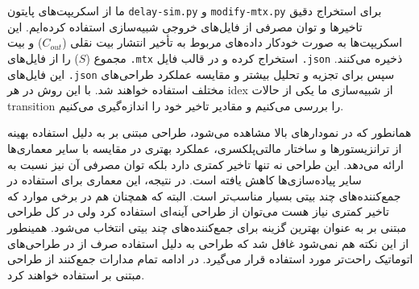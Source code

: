 ما از اسکریپت‌های پایتون \texttt{delay-sim.py} و \texttt{modify-mtx.py} برای استخراج دقیق تاخیرها و توان مصرفی از فایل‌های خروجی شبیه‌سازی استفاده کرده‌ایم. این اسکریپت‌ها به صورت خودکار داده‌های مربوط به تأخیر انتشار بیت نقلی ($C_{out}$) و بیت مجموع ($S$) را از فایل‌های \texttt{.mtx} استخراج کرده و در قالب فایل \texttt{.json} ذخیره می‌کنند. این فایل‌های \texttt{.json} سپس برای تجزیه و تحلیل بیشتر و مقایسه عملکرد طراحی‌های مختلف استفاده خواهند شد.
با این روش در هر idex از شبیه‌سازی ما یکی از حالات transition را بررسی می‌کنیم و مقادیر تاخیر خود را اندازه‌گیری می‌کنیم.



همانطور که در نمودارهای بالا مشاهده می‌شود، طراحی مبتنی بر  به دلیل استفاده بهینه از ترانزیستورها و ساختار مالتی‌پلکسری، عملکرد بهتری در مقایسه با سایر معماری‌ها ارائه می‌دهد. این طراحی نه تنها تاخیر کمتری دارد بلکه توان مصرفی آن نیز نسبت به سایر پیاده‌سازی‌ها کاهش یافته است. در نتیجه، این معماری برای استفاده در جمع‌کننده‌های چند بیتی بسیار مناسب‌تر است.
البته که همچنان هم در برخی موارد که تاخیر کمتری نیاز هست می‌توان از طراحی آینه‌ای استفاده کرد ولی در کل طراحی مبتنی بر  به عنوان بهترین گزینه برای جمع‌کننده‌های چند بیتی انتخاب می‌شود.
همینطور از این نکته هم نمی‌شود غافل شد که طراحی  به دلیل استفاده صرف از  در طراحی‌های اتوماتیک راحت‌تر مورد استفاده قرار می‌گیرد.
در ادامه تمام مدارات جمع‌کنند از طراحی مبتنی بر  استفاده خواهند کرد.




